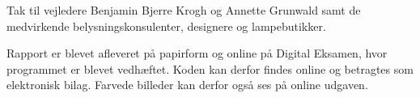 Tak til vejledere Benjamin Bjerre Krogh og Annette Grunwald samt de medvirkende belysningskonsulenter, designere og lampebutikker.

Rapport er blevet afleveret på papirform og online på Digital Eksamen, hvor programmet er blevet vedhæftet. Koden kan derfor findes online og betragtes som elektronisk bilag. Farvede billeder kan derfor også ses på online udgaven.
\clearpage

\clearpage